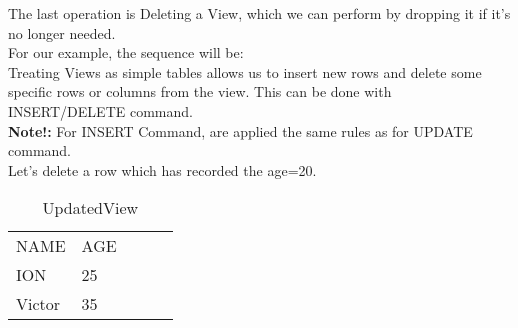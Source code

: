 The last operation is Deleting a View, which we can perform by dropping it if it's no longer needed.\\

For our example, the sequence will be:\\

\clearpage
Treating Views as simple tables allows us to insert new rows and delete some specific rows or columns from the view. This can be done with INSERT/DELETE command.\\

\textbf{Note!:} For INSERT Command, are applied the same rules as for UPDATE command.\\
Let's delete a row which has recorded the age=20.
\begin{table}[]
\centering
\caption{UpdatedView}
\begin{tabular}{lllll}
NAME   & AGE &  &  &  \\
ION    & 25  &  &  &  \\
Victor & 35  &  &  &  
\end{tabular}
\end{table}


\clearpage
